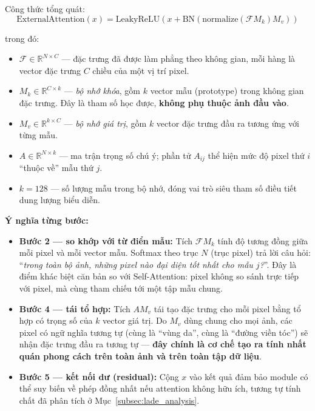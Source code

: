 Công thức tổng quát:
\begin{equation}
\label{eq:ext_attn}
\text{ExternalAttention}(x) = \text{LeakyReLU}\!\left(x + \text{BN}\!\left(\text{normalize}\!\left(\mathcal{F} M_k\right) M_v\right)\right)
\end{equation}

\noindent trong đó:
\begin{itemize}
    \item $\mathcal{F} \in \mathbb{R}^{N \times C}$ --- đặc trưng đã được làm phẳng theo không gian, mỗi hàng là vector đặc trưng $C$ chiều của một vị trí pixel.
    \item $M_k \in \mathbb{R}^{C \times k}$ --- \textit{bộ nhớ khóa}, gồm $k$ vector mẫu (prototype) trong không gian đặc trưng. Đây là tham số học được, \textbf{không phụ thuộc ảnh đầu vào}.
    \item $M_v \in \mathbb{R}^{k \times C}$ --- \textit{bộ nhớ giá trị}, gồm $k$ vector đặc trưng đầu ra tương ứng với từng mẫu.
    \item $A \in \mathbb{R}^{N \times k}$ --- ma trận trọng số chú ý; phần tử $A_{ij}$ thể hiện mức độ pixel thứ $i$ ``thuộc về'' mẫu thứ $j$.
    \item $k = 128$ --- số lượng mẫu trong bộ nhớ, đóng vai trò siêu tham số điều tiết dung lượng biểu diễn.
\end{itemize}

\textbf{Ý nghĩa từng bước:}
\begin{itemize}
    \item \textbf{Bước 2 --- so khớp với từ điển mẫu:} Tích $\mathcal{F} M_k$ tính độ tương đồng giữa mỗi pixel và mỗi vector mẫu. Softmax theo trục $N$ (trục pixel) trả lời câu hỏi: ``\textit{trong toàn bộ ảnh, những pixel nào đại diện tốt nhất cho mẫu $j$?}''. Đây là điểm khác biệt căn bản so với Self-Attention: pixel không so sánh trực tiếp với pixel, mà cùng tham chiếu tới một tập mẫu chung.
    \item \textbf{Bước 4 --- tái tổ hợp:} Tích $A M_v$ tái tạo đặc trưng cho mỗi pixel bằng tổ hợp có trọng số của $k$ vector giá trị. Do $M_v$ dùng chung cho mọi ảnh, các pixel có ngữ nghĩa tương tự (cùng là ``vùng da'', cùng là ``đường viền tóc'') sẽ nhận đặc trưng đầu ra tương tự --- \textbf{đây chính là cơ chế tạo ra tính nhất quán phong cách trên toàn ảnh và trên toàn tập dữ liệu}.
    \item \textbf{Bước 5 --- kết nối dư (residual):} Cộng $x$ vào kết quả đảm bảo module có thể suy biến về phép đồng nhất nếu attention không hữu ích, tương tự tính chất đã phân tích ở Mục~\ref{subsec:lade_analysis}.
\end{itemize}

